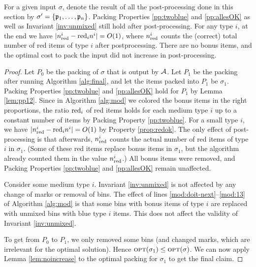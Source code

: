 \begin{theorem}
	\label{thm:red-alpha}
	For a given input $\sigma$, denote the result of all the post-processing done in this section by $\sigma'=\{\mathfrak{p}_1,\dots,\mathfrak{p}_n\}$. 
	Packing Properties \ref{pp:twoblue} and \ref{pp:allesOK} as well as Invariant \ref{inv:unmixed}
	still hold after post-processing.
	For any type $i$, at the end we have $|n_{\mathrm{red}}^i - \mathrm{red}_in^i|=O(1)$,
	where $n_{\mathrm{red}}^i$ counts the (correct) total number of red items of type $i$ after postprocessing.
	There are no bonus items, and  the optimal cost to pack the input did not increase in post-processing.
\end{theorem}
\begin{proof}
	Let $P_0$ be the packing of $\sigma$ that is output by $\mathcal{A}$.
	Let $P_1$ be the packing after running Algorithm \ref{alg:final}, and let the items packed into $P_1$ be $\sigma_1$.
	Packing Properties  \ref{pp:twoblue} and \ref{pp:allesOK} hold for $P_1$  by Lemma \ref{lem:pp12}. Since in Algorithm \ref{alg:mod} we colored the bonus items in the right proportions,
	the ratio $\mathrm{red}_i$ of red items holds for each medium type $i$ up to a constant number of items by Packing Property \ref{pp:twoblue}.
	For a small type $i$, we have $|n_{\mathrm{red}}^i - \mathrm{red}_in^i|=O(1)$ by Property \ref{prop:redok}.
	The only effect of post-processing is that afterwards, $n_{\mathrm{red}}^i$ counts the actual number of red items of type $i$ in $\sigma_1$.
	(Some of these red items replace bonus items in $\sigma_1$, but the algorithm already counted them in the value $n_{\mathrm{red}}^i$.)
All bonus items were removed, and Packing Properties  \ref{pp:twoblue} and \ref{pp:allesOK} remain unaffected.
	
	Consider some medium type $i$. Invariant \ref{inv:unmixed} is not affected by any change of marks or removal of bins.
	The effect of lines \ref{mod:doit-next}--\ref{mod:13} of Algorithm \ref{alg:mod} is that some bins with bonus items
	of type $i$ are replaced with unmixed bins with blue type $i$ items.
	This does not affect the validity of Invariant \ref{inv:unmixed}.	
	
	To get from $P_0$ to $P_1$, we only removed some bins (and changed marks, which are irrelevant for the optimal solution).
	Hence $\mbox{\textsc{opt}}(\sigma_1)\le\mbox{\textsc{opt}}(\sigma)$. We can now apply Lemma \ref{lem:noincrease} to the optimal packing for $\sigma_1$ to get the final claim.
\end{proof}














